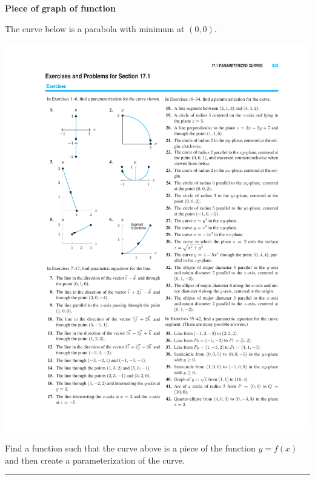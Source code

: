 \documentclass[12pt,letterpaper,noanswers]{exam}
\begin{document}
\vspace{1cm}



\noindent\textbf{Piece of graph of function}

The curve below is a parabola with minimum at $(0,0)$.

\includegraphics{img/N22_c4.pdf} 

Find a function such that the curve above is a piece of the function $y = f(x)$ and then create a parameterization of the curve. 

\vspace{2in}

\vspace{0.2cm}
\hrule
\vspace{0.2cm}
\end{document}
